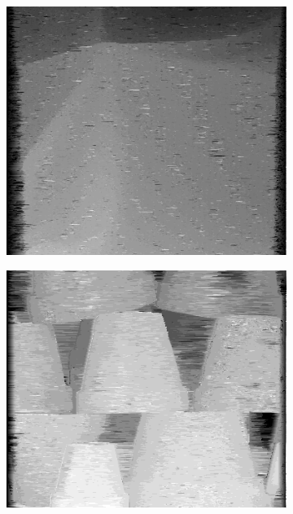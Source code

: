 \begin{figure}[h]
\centering
    \begin{subfigure}[t]{0.32\textwidth}
        \centering
        \includegraphics[width=\textwidth]{images/cloth_dynamic_result}
    \end{subfigure}
    \hfill
    \begin{subfigure}[t]{0.32\textwidth}
        \centering
        \includegraphics[width=\textwidth]{images/pots_dynamic_result}

\end{subfigure}
\end{figure}
